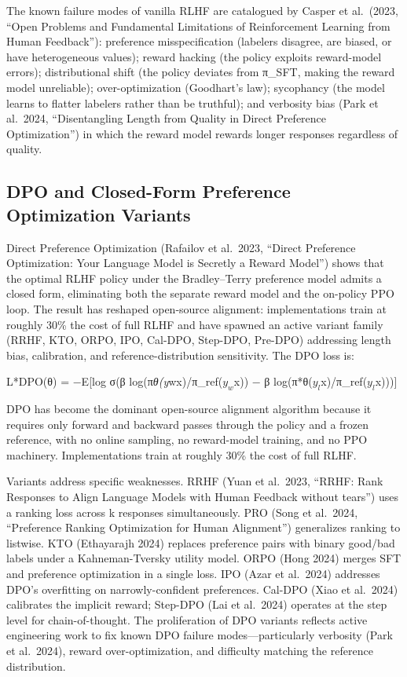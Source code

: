 \documentclass{article}
\begin{document}
The known failure modes of vanilla RLHF are catalogued by Casper et al.~(2023, ``Open Problems and Fundamental Limitations of Reinforcement Learning from Human Feedback''): preference misspecification (labelers disagree, are biased, or have heterogeneous values); reward hacking (the policy exploits reward-model errors); distributional shift (the policy deviates from π\_SFT, making the reward model unreliable); over-optimization (Goodhart's law); sycophancy (the model learns to flatter labelers rather than be truthful); and verbosity bias (Park et al.~2024, ``Disentangling Length from Quality in Direct Preference Optimization'') in which the reward model rewards longer responses regardless of quality.

\subsection{DPO and Closed-Form Preference Optimization Variants}\label{dpo-and-closed-form-preference-optimization-variants}

Direct Preference Optimization (Rafailov et al.~2023, ``Direct Preference Optimization: Your Language Model is Secretly a Reward Model'') shows that the optimal RLHF policy under the Bradley--Terry preference model admits a closed form, eliminating both the separate reward model and the on-policy PPO loop. The result has reshaped open-source alignment: implementations train at roughly 30\% the cost of full RLHF and have spawned an active variant family (RRHF, KTO, ORPO, IPO, Cal-DPO, Step-DPO, Pre-DPO) addressing length bias, calibration, and reference-distribution sensitivity. The DPO loss is:

L*DPO(θ) = −E{[}log σ(β log(π\emph{θ(y}w\textbar x)/π\_ref(\(y_w\)\textbar x)) − β log(π*θ(\(y_l\)\textbar x)/π\_ref(\(y_l\)\textbar x))){]}

DPO has become the dominant open-source alignment algorithm because it requires only forward and backward passes through the policy and a frozen reference, with no online sampling, no reward-model training, and no PPO machinery. Implementations train at roughly 30\% the cost of full RLHF.

Variants address specific weaknesses. RRHF (Yuan et al.~2023, ``RRHF: Rank Responses to Align Language Models with Human Feedback without tears'') uses a ranking loss across k responses simultaneously. PRO (Song et al.~2024, ``Preference Ranking Optimization for Human Alignment'') generalizes ranking to listwise. KTO (Ethayarajh 2024) replaces preference pairs with binary good/bad labels under a Kahneman-Tversky utility model. ORPO (Hong 2024) merges SFT and preference optimization in a single loss. IPO (Azar et al.~2024) addresses DPO's overfitting on narrowly-confident preferences. Cal-DPO (Xiao et al.~2024) calibrates the implicit reward; Step-DPO (Lai et al.~2024) operates at the step level for chain-of-thought. The proliferation of DPO variants reflects active engineering work to fix known DPO failure modes---particularly verbosity (Park et al.~2024), reward over-optimization, and difficulty matching the reference distribution.
\end{document}

